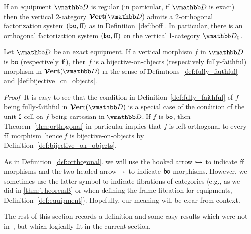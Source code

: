 \documentclass[11pt,oneside,article]{memoir}
\begin{document}
\begin{theorem}\label{thm:orthogonal}
   If an equipment $\dcat{D}$ is regular  (in particular, if $\dcat{D}$ is exact) then the vertical
   2-category $\VVer(\dcat{D})$ admits a 2-orthogonal factorization system $(\mathsf{bo},\mathsf{ff})$ as in
   Definition~\ref{def:boff}. In particular, there is an orthogonal factorization system $(\mathsf{bo},\mathsf{ff})$
   on the vertical 1-category $\dcat{D}_0$.
\end{theorem}

\begin{lemma}\label{lem:(bo,ff)_really_is}
   Let $\dcat{D}$ be an exact equipment. If a vertical morphism $f$ in $\dcat{D}$ is $\mathsf{bo}$
   (respectively $\mathsf{ff}$), then $f$ is a bijective-on-objects (respectively fully-faithful) morphism
   in $\VVer(\dcat{D})$ in the sense of
   Definitions~\ref{def:fully_faithful} and \ref{def:bijective_on_objects}.
\end{lemma}
\begin{proof}
   It is easy to see that the condition in Definition~\ref{def:fully_faithful} of $f$ being
   fully-faithful in $\VVer(\dcat{D})$ is a special case of the condition of the unit 2-cell on $f$
   being cartesian in $\dcat{D}$. If $f$ is $\mathsf{bo}$, then Theorem~\ref{thm:orthogonal} in particular
   implies that $f$ is left orthogonal to every $\mathsf{ff}$ morphism, hence $f$ is bijective-on-objects
   by Definition~\ref{def:bijective_on_objects}.
\end{proof}

\begin{remark}
   As in Definition~\ref{def:orthogonal}, we will use the hooked arrow $\hookrightarrow$ to indicate $\mathsf{ff}$
   morphisms and the two-headed arrow $\twoheadrightarrow$ to indicate $\mathsf{bo}$ morphisms. However, we sometimes use
   the latter symbol to indicate fibrations of categories (e.g., as we did in \ref{thm:TheoremB} or when defining the frame fibration for equipments, Definition~\ref{def:equipment}). Hopefully, our meaning will be clear from context.
   \end{remark}

The rest of this section records a definition and some easy results which were not
in~\cite{Schultz2015}, but which logically fit in the current section.
\end{document}
